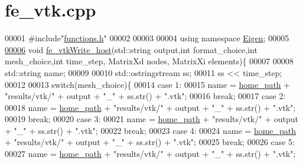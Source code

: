 \hypertarget{fe__vtk_8cpp_source}{}\section{fe\+\_\+vtk.\+cpp}
\label{fe__vtk_8cpp_source}

\begin{DoxyCode}
00001 \textcolor{preprocessor}{#include"\hyperlink{functions_8h}{functions.h}"}
00002 
00003 
00004 \textcolor{keyword}{using namespace }\hyperlink{namespace_eigen}{Eigen};
00005 
\hyperlink{fe__vtk_8cpp_ae02497eb9e23d26212b7a1301fc5b04b}{00006} \textcolor{keywordtype}{void} \hyperlink{fe__vtk_8cpp_ae02497eb9e23d26212b7a1301fc5b04b}{fe\_vtkWrite\_host}(std::string output,\textcolor{keywordtype}{int} format\_choice,\textcolor{keywordtype}{int} mesh\_choice,\textcolor{keywordtype}{int} time\_step,
      MatrixXd nodes, MatrixXi elements)\{
00007 
00008     std::string name;
00009 
00010     std::ostringstream ss;
00011     ss << time\_step;
00012 
00013     \textcolor{keywordflow}{switch}(mesh\_choice)\{
00014     \textcolor{keywordflow}{case} 1:
00015         name = \hyperlink{_global_variables_8h_a556ce46e457f991c51f3dac111579e2b}{home\_path} + \textcolor{stringliteral}{"results/vtk/"} + output + \textcolor{stringliteral}{"\_"} + ss.str() + \textcolor{stringliteral}{".vtk"};
00016         \textcolor{keywordflow}{break};
00017     \textcolor{keywordflow}{case} 2:
00018         name = \hyperlink{_global_variables_8h_a556ce46e457f991c51f3dac111579e2b}{home\_path} + \textcolor{stringliteral}{"results/vtk/"} + output + \textcolor{stringliteral}{"\_"} + ss.str() + \textcolor{stringliteral}{".vtk"};
00019         \textcolor{keywordflow}{break};
00020     \textcolor{keywordflow}{case} 3:
00021         name = \hyperlink{_global_variables_8h_a556ce46e457f991c51f3dac111579e2b}{home\_path} + \textcolor{stringliteral}{"results/vtk/"} + output + \textcolor{stringliteral}{"\_"} + ss.str() + \textcolor{stringliteral}{".vtk"};
00022         \textcolor{keywordflow}{break};
00023     \textcolor{keywordflow}{case} 4:
00024         name = \hyperlink{_global_variables_8h_a556ce46e457f991c51f3dac111579e2b}{home\_path} + \textcolor{stringliteral}{"results/vtk/"} + output + \textcolor{stringliteral}{"\_"} + ss.str() + \textcolor{stringliteral}{".vtk"};
00025         \textcolor{keywordflow}{break};
00026     \textcolor{keywordflow}{case} 5:
00027         name = \hyperlink{_global_variables_8h_a556ce46e457f991c51f3dac111579e2b}{home\_path} + \textcolor{stringliteral}{"results/vtk/"} + output + \textcolor{stringliteral}{"\_"} + ss.str() + \textcolor{stringliteral}{".vtk"};

\end{DoxyCode}
